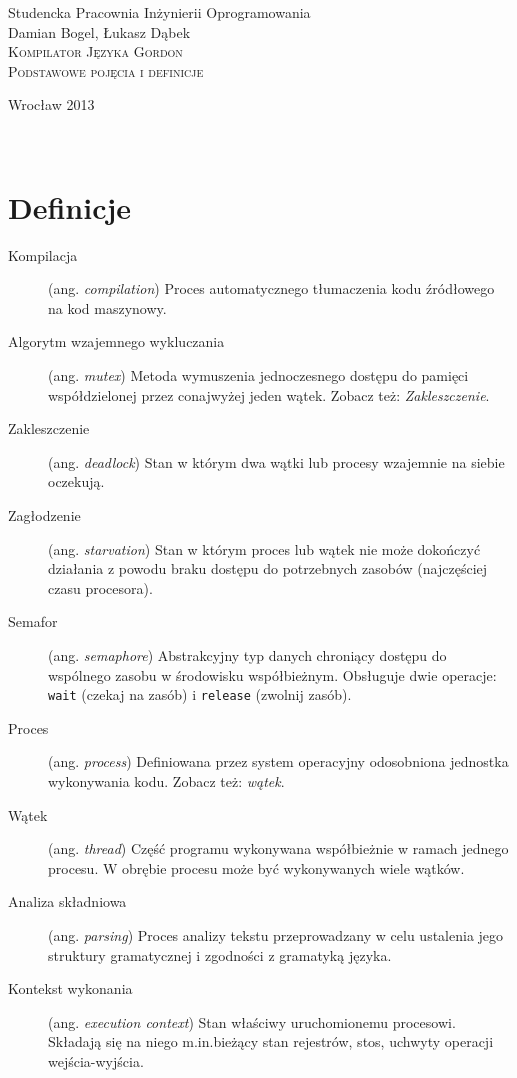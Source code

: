 \documentclass[12pt]{article}
\begin{document}
\begin{titlepage}
\begin{center}
Studencka Pracownia Inżynierii Oprogramowania\\[3.5cm]

Damian Bogel, Łukasz Dąbek\\[1cm]
\textsc{\LARGE Kompilator Języka Gordon}\\[1cm]
\textsc{\large Podstawowe pojęcia i definicje}

\vfill
Wrocław 2013

\end{center}
\end{titlepage}

\newpage
\setcounter{page}{2}
~
\newpage

\section{Definicje}
\begin{description}
    \item[Kompilacja] (ang. \emph{compilation}) Proces automatycznego tłumaczenia kodu źródłowego na kod maszynowy.
    \item[Algorytm wzajemnego wykluczania] (ang. \emph{mutex}) Metoda wymuszenia jednoczesnego dostępu do pamięci współdzielonej przez conajwyżej jeden wątek. Zobacz też: \emph{Zakleszczenie}.
    \item[Zakleszczenie] (ang. \emph{deadlock}) Stan w którym dwa wątki lub procesy wzajemnie na siebie oczekują.
    \item[Zagłodzenie] (ang. \emph{starvation}) Stan w którym proces lub wątek nie może dokończyć działania z powodu braku dostępu do potrzebnych zasobów (najczęściej czasu procesora).
    \item[Semafor] (ang. \emph{semaphore}) Abstrakcyjny typ danych chroniący dostępu do wspólnego zasobu w środowisku współbieżnym. Obsługuje dwie operacje: \texttt{wait} (czekaj na zasób) i \texttt{release} (zwolnij zasób).
    \item[Proces] (ang. \emph{process}) Definiowana przez system operacyjny odosobniona jednostka wykonywania kodu. Zobacz też: \emph{wątek}.
    \item[Wątek] (ang. \emph{thread}) Część programu wykonywana współbieżnie w ramach jednego procesu. W obrębie procesu może być wykonywanych wiele wątków.
    \item[Analiza składniowa] (ang. \emph{parsing}) Proces analizy tekstu przeprowadzany w celu ustalenia jego struktury gramatycznej i zgodności z gramatyką języka.
    \item[Kontekst wykonania] (ang. \emph{execution context}) Stan właściwy uruchomionemu procesowi. Składają się na niego m.in.bieżący stan rejestrów, stos, uchwyty operacji wejścia-wyjścia.
\end{description}
\end{document}
